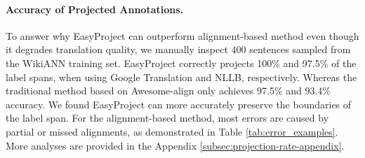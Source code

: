 \documentclass[11pt,dvipsnames]{article}
\begin{document}
\vspace{-2.5pt}
\paragraph{Accuracy of Projected Annotations.} To answer why EasyProject can outperform  alignment-based method even though it degrades translation quality, we manually inspect  400 sentences sampled from the WikiANN training set. EasyProject correctly projects 100\% and 97.5\% of the label spans,  when using Google Translation and NLLB, respectively. Whereas the traditional method based on Awesome-align only achieves 97.5\% and 93.4\% accuracy.  We found EasyProject can  more accurately  preserve the boundaries of the label span. For the alignment-based method, most errors are caused by partial or missed alignments, as demonstrated in Table \ref{tab:error_examples}. More analyses are provided in the Appendix \ref{subsec:projection-rate-appendix}.









\vspace{-1pt}
\end{document}

